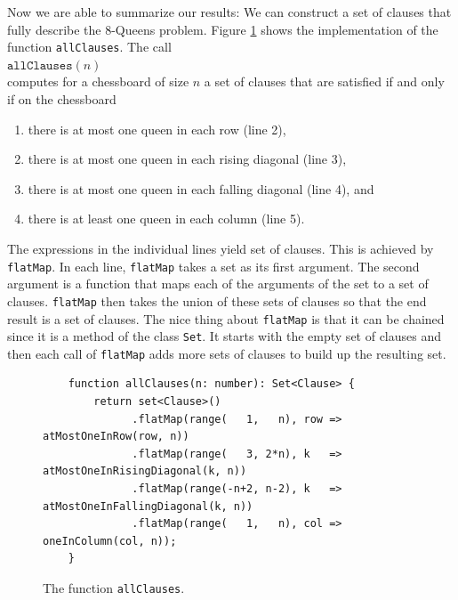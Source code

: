 Now we are able to summarize our results: We can construct a set of clauses that fully describe the 8-Queens problem.
Figure \ref{fig:allClauses} shows the implementation of the function \texttt{allClauses}.
The call \\[0.2cm]
\hspace*{1.3cm} $\texttt{allClauses}(n)$ \\[0.2cm]
computes for a chessboard of size $n$ a set of clauses that
are satisfied if and only if on the chessboard
\begin{enumerate}
\item there is at most one queen in each row (line 2),
\item there is at most one queen in each rising diagonal (line 3),
\item there is at most one queen in each falling diagonal (line 4), and
\item there is at least one queen in each column (line 5).
\end{enumerate}
The expressions in the individual lines yield set of clauses.  This is achieved by \texttt{flatMap}.
In each line, \texttt{flatMap} takes a set as its first argument.  The second argument is a function that maps
each of the arguments of the set to a set of clauses.  \texttt{flatMap} then takes the union of these sets of
clauses so that the end result is a set of clauses.  The nice thing about \texttt{flatMap} is that it can be
chained since it is a method of the class \texttt{Set}.  It starts with the empty set of clauses and then each
call of \texttt{flatMap} adds more sets of clauses to build up the resulting set.

\begin{figure}[!ht]
  \centering
\begin{verbatim}
    function allClauses(n: number): Set<Clause> {
        return set<Clause>()
              .flatMap(range(   1,   n), row => atMostOneInRow(row, n))
              .flatMap(range(   3, 2*n), k   => atMostOneInRisingDiagonal(k, n))
              .flatMap(range(-n+2, n-2), k   => atMostOneInFallingDiagonal(k, n))
              .flatMap(range(   1,   n), col => oneInColumn(col, n));
    }                
\end{verbatim}
\vspace*{-0.3cm}
  \caption{The function \texttt{allClauses}.}
  \label{fig:allClauses}
\end{figure}


